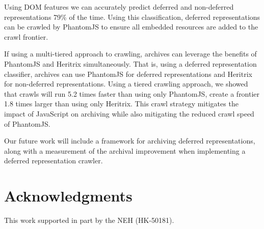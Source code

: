 \documentclass{ipres_proc_article-sp}
\begin{document}
Using DOM features we can accurately predict deferred and non-deferred representations 79\% of the time. Using this classification, deferred representations can be crawled by PhantomJS to ensure all embedded resources are added to the crawl frontier.

If using a multi-tiered approach to crawling, archives can leverage the benefits of PhantomJS and Heritrix simultaneously. That is, using a deferred representation classifier, archives can use PhantomJS for deferred representations and Heritrix for non-deferred representations. Using a tiered crawling approach, we showed that crawls will run 5.2 times faster than using only PhantomJS, create a frontier 1.8 times larger than using only Heritrix. This crawl strategy mitigates the impact of JavaScript on archiving while also mitigating the reduced crawl speed of PhantomJS.

Our future work will include a framework for archiving deferred representations, along with a measurement of the archival improvement when implementing a deferred representation crawler. 



\section{Acknowledgments}
This work supported in part by the NEH (HK-50181).
\end{document}
